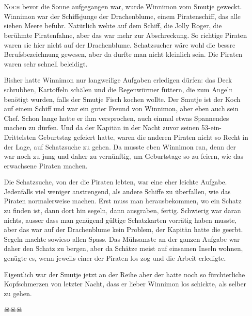 \chapter*{}
\lettrine[lines=3]{\color{DeepPink}N}{och} bevor die Sonne aufgegangen war,
wurde Winnimon vom Smutje geweckt. Winnimon war der Schiffsjunge der
Drachenblume, einem Piratenschiff, das alle sieben Meere befuhr. Natürlich
wehte auf dem Schiff, die Jolly Roger, die berühmte Piratenfahne, aber das war
mehr zur Abschreckung. So richtige Piraten waren sie hier nicht auf der
Drachenblume. Schatzsucher wäre wohl die bessre Berufsbezeichnung gewesen, aber
da durfte man nicht kleinlich sein. Die Piraten waren sehr schnell beleidigt.

Bisher hatte Winnimon nur langweilige Aufgaben erledigen dürfen: das Deck
schrubben, Kartoffeln schälen und die Regenwürmer füttern, die zum Angeln
benötigt wurden, falls der Smutje Fisch kochen wollte. Der Smutje ist der Koch
auf einem Schiff und war ein guter Freund von Winnimon, aber eben auch sein
Chef. Schon lange hatte er ihm versprochen, auch einmal etwas Spannendes machen
zu dürfen. Und da der Kapitän in der Nacht zuvor seinen 53-ein-Drittelsten
Geburtstag gefeiert hatte, waren die anderen Piraten nicht so Recht in der
Lage, auf Schatzsuche zu gehen. Da musste eben Winnimon ran, denn der war noch
zu jung und daher zu vernünftig, um Geburtstage so zu feiern, wie das erwachsene Piraten machen.

Die Schatzsuche, von der die Piraten lebten, war eine eher leichte Aufgabe. Jedenfalls viel weniger anstrengend, als andere Schiffe zu überfallen, wie das Piraten normalerweise machen. Erst muss man herausbekommen, wo ein Schatz zu finden ist, dann dort hin segeln, dann ausgraben, fertig. Schwierig war daran nichts, ausser dass man genügend gültige Schatzkarten vorrätig haben musste, aber das war auf der Drachenblume kein Problem, der Kapitän hatte die geerbt. Segeln machte sowieso allen Spass. Das Mühsamste an der ganzen Aufgabe war daher den Schatz zu bergen, aber da Schätze meist auf einsamen Inseln wohnen, genügte es, wenn jeweils einer der Piraten los zog und die Arbeit erledigte.

Eigentlich war der Smutje jetzt an der Reihe aber der hatte noch so fürchterliche Kopfschmerzen von letzter Nacht, dass er lieber Winnimon los schickte, als selber zu gehen.

\begin{center}
{\color{DeepPink} $\skull \skull \skull$}
\end{center}

